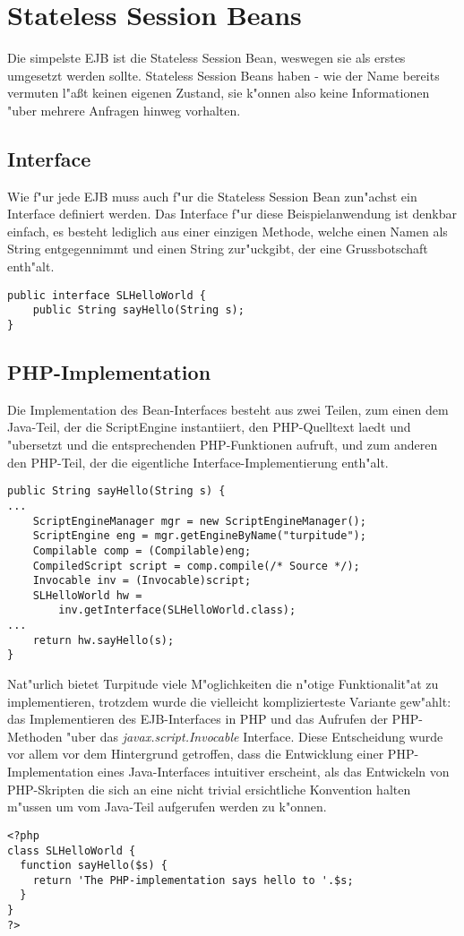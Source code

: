 \section{Stateless Session Beans}
\label{sec:chap2:slsb}

Die simpelste EJB ist die Stateless Session Bean, weswegen sie als erstes umgesetzt werden sollte.
Stateless Session Beans haben - wie der Name bereits vermuten l"a\ss t keinen eigenen Zustand, sie
k"onnen also keine Informationen "uber mehrere Anfragen hinweg vorhalten.

\subsection{Interface}
\label{sec:chap2:slsb:if}
Wie f"ur jede EJB muss auch f"ur die Stateless Session Bean zun"achst ein Interface definiert werden.
Das Interface f"ur diese Beispielanwendung ist denkbar einfach, es besteht lediglich aus einer einzigen
Methode, welche einen Namen als String entgegennimmt und einen String zur"uckgibt, der eine
Grussbotschaft enth"alt. 
\begin{lstlisting}[caption=Stateless Hello World Interface]
public interface SLHelloWorld {
    public String sayHello(String s);
}
\end{lstlisting}

\subsection{PHP-Implementation}
\label{sec:chap2:slsb:impl}

Die Implementation des Bean-Interfaces besteht aus zwei Teilen, zum einen dem Java-Teil, der die
ScriptEngine instantiiert, den PHP-Quelltext laedt und "ubersetzt und die entsprechenden PHP-Funktionen
aufruft, und zum anderen den PHP-Teil, der die eigentliche Interface-Implementierung enth"alt.
\begin{lstlisting}[caption=Java-Teil]
public String sayHello(String s) {
...
    ScriptEngineManager mgr = new ScriptEngineManager();
    ScriptEngine eng = mgr.getEngineByName("turpitude");
    Compilable comp = (Compilable)eng;
    CompiledScript script = comp.compile(/* Source */);
    Invocable inv = (Invocable)script;
    SLHelloWorld hw = 
        inv.getInterface(SLHelloWorld.class);
...
    return hw.sayHello(s);
}
\end{lstlisting}
Nat"urlich bietet Turpitude viele M"oglichkeiten die n"otige Funktionalit"at zu implementieren,
trotzdem wurde die vielleicht komplizierteste Variante gew"ahlt: das Implementieren des EJB-Interfaces in
PHP und das Aufrufen der PHP-Methoden "uber das \emph{javax.script.Invocable} Interface. Diese Entscheidung 
wurde vor allem vor dem Hintergrund getroffen, dass die Entwicklung einer PHP-Implementation eines Java-Interfaces
intuitiver erscheint, als das Entwickeln von PHP-Skripten die sich an eine nicht trivial ersichtliche
Konvention halten m"ussen um vom Java-Teil aufgerufen werden zu k"onnen.
\begin{lstlisting}[caption=PHP-Implementierung]
<?php
class SLHelloWorld {
  function sayHello($s) {
    return 'The PHP-implementation says hello to '.$s;
  }
}
?>
\end{lstlisting}
